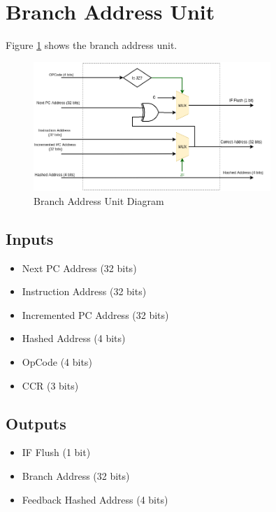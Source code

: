 \section{Branch Address Unit}
Figure \ref{fig:bau} shows the branch address unit.
\begin{figure}[hp]
    \centering
    \includegraphics[width=0.8\textwidth]{images/bau.png}
    \caption{Branch Address Unit Diagram}
    \label{fig:bau}
\end{figure}

\subsection{Inputs}
\begin{itemize}
    \item Next PC Address (32 bits)
    \item Instruction Address (32 bits)
    \item Incremented PC Address (32 bits)
    \item Hashed Address (4 bits)
    \item OpCode (4 bits)
    \item CCR (3 bits)
\end{itemize}

\subsection{Outputs}
\begin{itemize}
    \item IF Flush (1 bit)
    \item Branch Address (32 bits)
    \item Feedback Hashed Address (4 bits)
\end{itemize}


